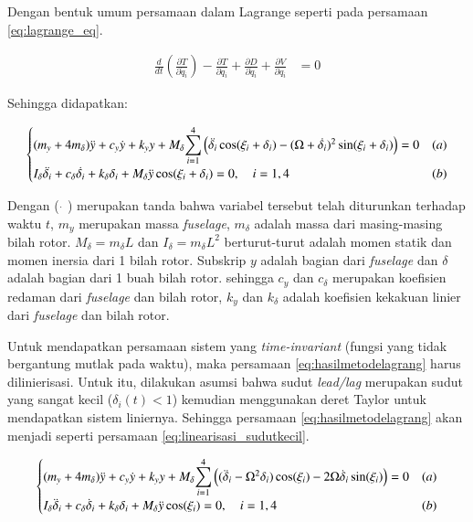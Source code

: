 Dengan bentuk umum persamaan dalam Lagrange seperti pada persamaan \ref{eq:lagrange_eq}.

\begin{align}
	\frac{d}{dt}\left(\frac{\partial T}{\partial \dot{q}_i}\right) - \frac{\partial T}{\partial q_i} + \frac{\partial D}{\partial \dot{q}_i} + \frac{\partial V}{\partial q_i} &= 0
	\label{eq:lagrange_eq}
\end{align}

Sehingga didapatkan:

\begin{equation}
	\begin{cases}
		(m_y+4m_\delta)\ddot{y}+c_y\dot{y}+k_yy+M_\delta\mathlarger{\sum}_{i=1}^{4}\left(\ddot{\delta_i}\cos(\xi_i+\delta_i)-(\Omega+\dot{\delta_i})^2\sin(\xi_i+\delta_i)\right) = 0 & (a) \\
		I_\delta\ddot{\delta_i}+c_\delta\dot{\delta_i}+k_\delta\delta_i+M_\delta \ddot{y}\cos(\xi_i+\delta_i)=0, \quad i=1,4 & (b)
	\end{cases}
	\label{eq:hasilmetodelagrang}
\end{equation}

Dengan ( $\dot{}$ ) merupakan tanda bahwa variabel tersebut telah diturunkan terhadap waktu $t$, $m_y$ merupakan massa \textit{fuselage}, $m_\delta$ adalah massa dari masing-masing bilah rotor. $M_\delta = m_\delta L$ dan $I_\delta = m_\delta L^2$ berturut-turut adalah momen statik dan momen inersia dari 1 bilah rotor. Subskrip $y$ adalah bagian dari \textit{fuselage} dan $\delta$ adalah bagian dari 1 buah bilah rotor. sehingga $c_y$ dan $c_\delta$ merupakan koefisien redaman dari \textit{fuselage} dan bilah rotor, $k_y$ dan $k_\delta$ adalah koefisien kekakuan linier dari \textit{fuselage} dan bilah rotor.

Untuk mendapatkan persamaan sistem yang \textit{time-invariant} (fungsi yang tidak bergantung mutlak pada waktu), maka persamaan \ref{eq:hasilmetodelagrang} harus dilinierisasi. Untuk itu, dilakukan asumsi bahwa sudut \textit{lead/lag} merupakan sudut yang sangat kecil ($\delta_i(t)<1$) kemudian menggunakan deret Taylor untuk mendapatkan sistem liniernya. Sehingga persamaan \ref{eq:hasilmetodelagrang} akan menjadi seperti persamaan \ref{eq:linearisasi_sudutkecil}.

\begin{equation}
	\begin{cases}
		(m_y+4m_\delta)\ddot{y}+c_y\dot{y}+k_yy+M_\delta\mathlarger{\sum}_{i=1}^{4}\left((\ddot{\delta}_i-\Omega^2\delta_i)\cos(\xi_i)-2\Omega \dot{\delta}_i\sin(\xi_i)\right) = 0 & (a) \\
		I_\delta\ddot{\delta}_i+c_\delta\dot{\delta}_i+k_\delta\delta_i+M_\delta \ddot{y}\cos(\xi_i)=0, \quad i=1,4 & (b)
	\end{cases}
\label{eq:linearisasi_sudutkecil}
\end{equation}

